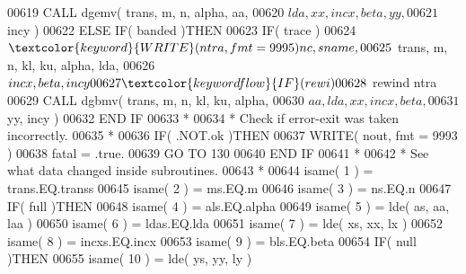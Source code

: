 \begin{DoxyCode}
00619                                  \textcolor{keyword}{CALL }dgemv( trans, m, n, alpha, aa,
00620      $                                       lda, xx, incx, beta, yy,
00621      $                                       incy )
00622                               \textcolor{keywordflow}{ELSE} \textcolor{keywordflow}{IF}( banded )\textcolor{keywordflow}{THEN}
00623                                  \textcolor{keywordflow}{IF}( trace )
00624      $                              \textcolor{keyword}{WRITE}( ntra, fmt = 9995 )nc, sname,
00625      $                              trans, m, n, kl, ku, alpha, lda,
00626      $                              incx, beta, incy
00627                                  \textcolor{keywordflow}{IF}( rewi )
00628      $                              rewind ntra
00629                                  \textcolor{keyword}{CALL }dgbmv( trans, m, n, kl, ku, alpha,
00630      $                                       aa, lda, xx, incx, beta,
00631      $                                       yy, incy )
00632 \textcolor{keywordflow}{                              END IF}
00633 \textcolor{comment}{*}
00634 \textcolor{comment}{*                             Check if error-exit was taken incorrectly.}
00635 \textcolor{comment}{*}
00636                               \textcolor{keywordflow}{IF}( .NOT.ok )\textcolor{keywordflow}{THEN}
00637                                  \textcolor{keyword}{WRITE}( nout, fmt = 9993 )
00638                                  fatal = .true.
00639                                  \textcolor{keywordflow}{GO TO} 130
00640 \textcolor{keywordflow}{                              END IF}
00641 \textcolor{comment}{*}
00642 \textcolor{comment}{*                             See what data changed inside subroutines.}
00643 \textcolor{comment}{*}
00644                               isame( 1 ) = trans.EQ.transs
00645                               isame( 2 ) = ms.EQ.m
00646                               isame( 3 ) = ns.EQ.n
00647                               \textcolor{keywordflow}{IF}( full )\textcolor{keywordflow}{THEN}
00648                                  isame( 4 ) = als.EQ.alpha
00649                                  isame( 5 ) = lde( as, aa, laa )
00650                                  isame( 6 ) = ldas.EQ.lda
00651                                  isame( 7 ) = lde( xs, xx, lx )
00652                                  isame( 8 ) = incxs.EQ.incx
00653                                  isame( 9 ) = bls.EQ.beta
00654                                  \textcolor{keywordflow}{IF}( null )\textcolor{keywordflow}{THEN}
00655                                     isame( 10 ) = lde( ys, yy, ly )

\end{DoxyCode}
